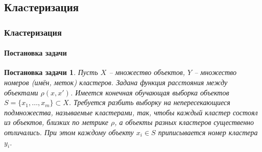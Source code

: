 \documentclass[xcolor=table]{beamer}
\newtheorem{prob}{Постановка задачи}
\begin{document}
\subsection{Клаcтеризация}
\begin{frame}
  \frametitle{Кластеризация}
  \framesubtitle{Постановка задачи}

  \begin{center}
  \end{center}

  \begin{prob}
    Пусть $X$ -- множество объектов, $Y$ -- множество номеров (имён, меток) кластеров. Задана функция расстояния между объектами $\rho(x, x')$.
    Имеется конечная обучающая выборка объектов $S = \{x_1, \dots, x_m\} \subset X$. Требуется разбить выборку на непересекающиеся
    подмножества, называемые \emph{кластерами}, так, чтобы каждый кластер состоял из объектов, близких по метрике $\rho$,
    а объекты разных кластеров существенно отличались. При этом каждому объекту $x_i \in S$ приписывается номер кластера $y_i$.
  \end{prob}
\end{frame}
\end{document}
